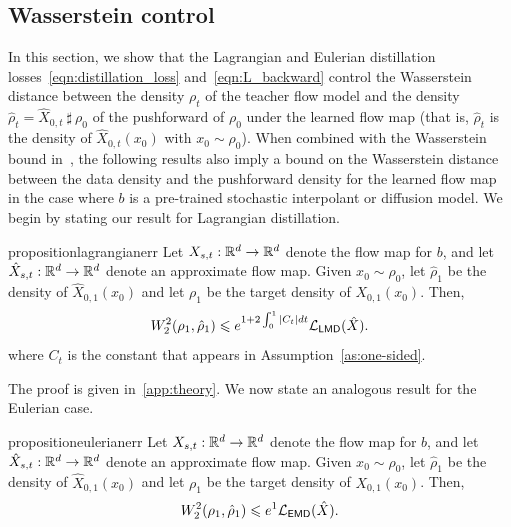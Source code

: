 \subsection{Wasserstein control}
\label{ssec:wasserstein}
%
In this section, we show that the Lagrangian and Eulerian distillation losses~\eqref{eqn:distillation_loss} and~\eqref{eqn:L_backward} control the Wasserstein distance between the density $\rho_t$ of the teacher flow model and the density $\hat{\rho}_t = \hat{X}_{0,t}\:\sharp\:\rho_0$ of the pushforward of $\rho_0$ under the learned flow map (that is, $\hat \rho_t$ is the density of $\hat X_{0,t}(x_0)$ with $x_0 \sim \rho_0$).
%
When combined with the Wasserstein bound in~\citet{albergo2022building}, the following results also imply a bound on the Wasserstein distance between the data density and the pushforward density for the learned flow map in the case where $b$ is a pre-trained stochastic interpolant or diffusion model.
%
We begin by stating our result for Lagrangian distillation.
\begin{restatable}{proposition}{lagrangianerr}
	\label{prop:lagrange_wasserstein}
	Let $X_{s, t}: \mathbb{R}^d\rightarrow \mathbb{R}^d$ denote the flow map for $b$, and let $\hat{X}_{s, t}: \mathbb{R}^d \rightarrow \mathbb{R}^d$ denote an approximate flow map.
	Given $x_0\sim\rho_0$, let $\hat{\rho}_1$ be the density of $\hat X_{0,1}(x_0)$ and let $\rho_1$ be the target density of $X_{0,1}(x_0)$.
	Then,
	\begin{equation}
		\label{eq:W2:1}
		W_2^2(\rho_1, \hat{\rho}_1) \leqslant e^{1+2\int_0^1|C_t|dt}\mathcal{L}_{\mathsf{LMD}}(\hat{X}).
	\end{equation}
	where $C_t$ is the constant that appears in Assumption~\ref{as:one-sided}.
\end{restatable}
The proof is given in~\cref{app:theory}.
%
We now state an analogous result for the Eulerian case.
\begin{restatable}{proposition}{eulerianerr}
	\label{prop:euler_wasserstein}
	Let $X_{s, t}: \mathbb{R}^d\rightarrow \mathbb{R}^d$ denote the flow map for $b$, and let $\hat{X}_{s, t}: \mathbb{R}^d \rightarrow \mathbb{R}^d$ denote an approximate flow map.
	Given $x_0\sim\rho_0$, let $\hat{\rho}_1$ be the density of $\hat X_{0,1}(x_0)$ and let $\rho_1$ be the target density of $X_{0,1}(x_0)$.
	Then,
	\begin{equation}
		\label{eq:W2:2}
		W_2^2(\rho_1, \hat{\rho}_1) \leqslant e^1 \mathcal{L}_{\mathsf{EMD}}(\hat{X}).
	\end{equation}
\end{restatable}

